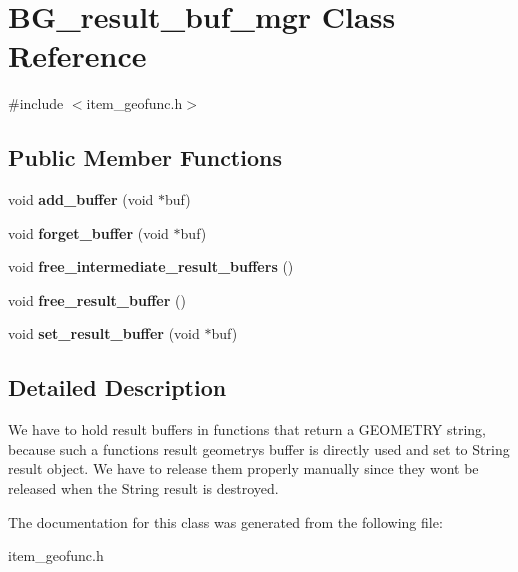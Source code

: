 \hypertarget{classBG__result__buf__mgr}{}\section{B\+G\+\_\+result\+\_\+buf\+\_\+mgr Class Reference}
\label{classBG__result__buf__mgr}


{\ttfamily \#include $<$item\+\_\+geofunc.\+h$>$}

\subsection*{Public Member Functions}
\begin{DoxyCompactItemize}
\item 
\mbox{\label{classBG__result__buf__mgr_a14cec504440e116def67d0b0b04da80e}} 
void {\bfseries add\+\_\+buffer} (void $\ast$buf)
\item 
\mbox{\label{classBG__result__buf__mgr_acea58298589fe1a4c96278bbbc0b72f7}} 
void {\bfseries forget\+\_\+buffer} (void $\ast$buf)
\item 
\mbox{\label{classBG__result__buf__mgr_ab62866df67a3dab9dd850defc1a3eae8}} 
void {\bfseries free\+\_\+intermediate\+\_\+result\+\_\+buffers} ()
\item 
\mbox{\label{classBG__result__buf__mgr_af87ce8d9348a9a063e71e1954e3ed4f8}} 
void {\bfseries free\+\_\+result\+\_\+buffer} ()
\item 
\mbox{\label{classBG__result__buf__mgr_a3fbaf9c5396d981de6232b2269520bd7}} 
void {\bfseries set\+\_\+result\+\_\+buffer} (void $\ast$buf)
\end{DoxyCompactItemize}


\subsection{Detailed Description}
We have to hold result buffers in functions that return a G\+E\+O\+M\+E\+T\+RY string, because such a function\textquotesingle{}s result geometry\textquotesingle{}s buffer is directly used and set to String result object. We have to release them properly manually since they won\textquotesingle{}t be released when the String result is destroyed. 

The documentation for this class was generated from the following file\+:\begin{DoxyCompactItemize}
\item 
item\+\_\+geofunc.\+h\end{DoxyCompactItemize}
